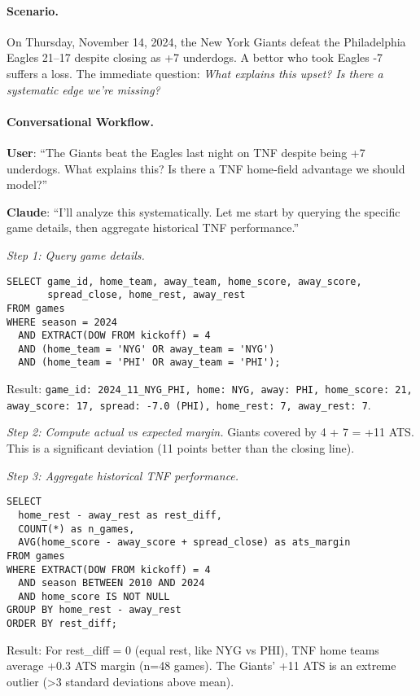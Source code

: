 \paragraph{Scenario.}
On Thursday, November 14, 2024, the New York Giants defeat the Philadelphia Eagles 21--17 despite closing as +7 underdogs. A bettor who took Eagles -7 suffers a loss. The immediate question: \textit{What explains this upset? Is there a systematic edge we're missing?}

\paragraph{Conversational Workflow.}
\textbf{User}: ``The Giants beat the Eagles last night on TNF despite being +7 underdogs. What explains this? Is there a TNF home‑field advantage we should model?''

\textbf{Claude}: ``I'll analyze this systematically. Let me start by querying the specific game details, then aggregate historical TNF performance.''

\textit{Step 1: Query game details.}
\begin{verbatim}
SELECT game_id, home_team, away_team, home_score, away_score,
       spread_close, home_rest, away_rest
FROM games
WHERE season = 2024
  AND EXTRACT(DOW FROM kickoff) = 4
  AND (home_team = 'NYG' OR away_team = 'NYG')
  AND (home_team = 'PHI' OR away_team = 'PHI');
\end{verbatim}

Result: \texttt{game\_id: 2024\_11\_NYG\_PHI, home: NYG, away: PHI, home\_score: 21, away\_score: 17, spread: -7.0 (PHI), home\_rest: 7, away\_rest: 7}.

\textit{Step 2: Compute actual vs expected margin.}
Giants covered by 4 + 7 = +11 ATS. This is a significant deviation (11 points better than the closing line).

\textit{Step 3: Aggregate historical TNF performance.}
\begin{verbatim}
SELECT
  home_rest - away_rest as rest_diff,
  COUNT(*) as n_games,
  AVG(home_score - away_score + spread_close) as ats_margin
FROM games
WHERE EXTRACT(DOW FROM kickoff) = 4
  AND season BETWEEN 2010 AND 2024
  AND home_score IS NOT NULL
GROUP BY home_rest - away_rest
ORDER BY rest_diff;
\end{verbatim}

Result: For rest\_diff = 0 (equal rest, like NYG vs PHI), TNF home teams average +0.3 ATS margin (n=48 games). The Giants' +11 ATS is an extreme outlier (>3 standard deviations above mean).

